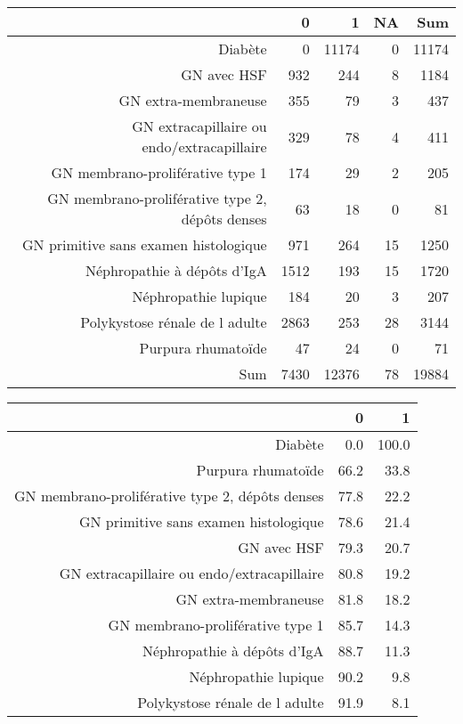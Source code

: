 \documentclass[11pt,a4paper]{article}\usepackage[]{graphicx}\usepackage[]{color}
\begin{document}
\begin{table}[ht]
\centering
\begin{tabular}{rrrrr}
  \hline
 & 0 & 1 & NA & Sum \\ 
  \hline
Diabète & 0 & 11174 & 0 & 11174 \\ 
  GN avec HSF & 932 & 244 & 8 & 1184 \\ 
  GN extra-membraneuse & 355 & 79 & 3 & 437 \\ 
  GN extracapillaire ou endo/extracapillaire & 329 & 78 & 4 & 411 \\ 
  GN membrano-proliférative type 1 & 174 & 29 & 2 & 205 \\ 
  GN membrano-proliférative type 2, dépôts denses & 63 & 18 & 0 & 81 \\ 
  GN primitive sans examen histologique & 971 & 264 & 15 & 1250 \\ 
  Néphropathie à dépôts d'IgA & 1512 & 193 & 15 & 1720 \\ 
  Néphropathie lupique & 184 & 20 & 3 & 207 \\ 
  Polykystose rénale de l adulte & 2863 & 253 & 28 & 3144 \\ 
  Purpura rhumatoïde & 47 & 24 & 0 & 71 \\ 
  Sum & 7430 & 12376 & 78 & 19884 \\ 
   \hline
\end{tabular}
\end{table}
\begin{table}[H]
\centering
\begin{tabular}{rrr}
  \hline
 & 0 & 1 \\ 
  \hline
Diabète & 0.0 & 100.0 \\ 
  Purpura rhumatoïde & 66.2 & 33.8 \\ 
  GN membrano-proliférative type 2, dépôts denses & 77.8 & 22.2 \\ 
  GN primitive sans examen histologique & 78.6 & 21.4 \\ 
  GN avec HSF & 79.3 & 20.7 \\ 
  GN extracapillaire ou endo/extracapillaire & 80.8 & 19.2 \\ 
  GN extra-membraneuse & 81.8 & 18.2 \\ 
  GN membrano-proliférative type 1 & 85.7 & 14.3 \\ 
  Néphropathie à dépôts d'IgA & 88.7 & 11.3 \\ 
  Néphropathie lupique & 90.2 & 9.8 \\ 
  Polykystose rénale de l adulte & 91.9 & 8.1 \\ 
   \hline
\end{tabular}
\end{table}
\end{document}
